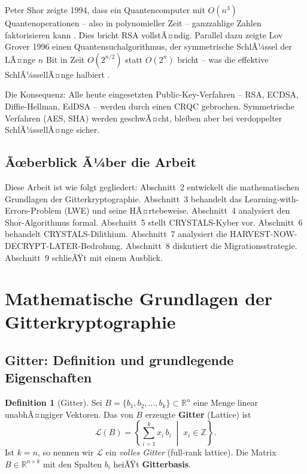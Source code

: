﻿\documentclass[a4paper,12pt]{article}
\theoremstyle{definition}
\newtheorem{definition}{Definition}[section]
\begin{document}
Peter Shor zeigte 1994, dass ein Quantencomputer mit $O(n^3)$ Quantenoperationen
-- also in polynomieller Zeit -- ganzzahlige Zahlen faktorisieren kann \cite{Sho94}.
Dies bricht RSA vollstÃ¤ndig. Parallel dazu zeigte Lov Grover 1996 einen
Quantensuchalgorithmus, der symmetrische SchlÃ¼ssel der LÃ¤nge $n$ Bit in Zeit
$O(2^{n/2})$ statt $O(2^n)$ bricht -- was die effektive SchlÃ¼ssellÃ¤nge halbiert
\cite{Gro96}.

Die Konsequenz: Alle heute eingesetzten Public-Key-Verfahren -- RSA, ECDSA,
Diffie-Hellman, EdDSA -- werden durch einen CRQC gebrochen. Symmetrische Verfahren
(AES, SHA) werden geschwÃ¤cht, bleiben aber bei verdoppelter SchlÃ¼ssellÃ¤nge sicher.

\subsection{Ãœberblick Ã¼ber die Arbeit}

Diese Arbeit ist wie folgt gegliedert: Abschnitt~2 entwickelt die mathematischen
Grundlagen der Gitterkryptographie. Abschnitt~3 behandelt das
Learning-with-Errors-Problem (LWE) und seine HÃ¤rtebeweise. Abschnitt~4 analysiert
den Shor-Algorithmus formal. Abschnitt~5 stellt CRYSTALS-Kyber vor.
Abschnitt~6 behandelt CRYSTALS-Dilithium. Abschnitt~7 analysiert die
HARVEST-NOW-DECRYPT-LATER-Bedrohung. Abschnitt~8 diskutiert die
Migrationsstrategie. Abschnitt~9 schlieÃŸt mit einem Ausblick.

\section{Mathematische Grundlagen der Gitterkryptographie}

\subsection{Gitter: Definition und grundlegende Eigenschaften}

\begin{definition}[Gitter]
Sei $B = \{b_1, b_2, \ldots, b_k\} \subset \mathbb{R}^n$ eine Menge linear
unabhÃ¤ngiger Vektoren. Das von $B$ erzeugte \textbf{Gitter} (Lattice) ist
\[
  \mathcal{L}(B) = \left\{ \sum_{i=1}^{k} x_i \, b_i \;\middle|\; x_i \in \mathbb{Z} \right\}.
\]
Ist $k = n$, so nennen wir $\mathcal{L}$ ein \emph{volles Gitter} (full-rank lattice).
Die Matrix $B \in \mathbb{R}^{n \times k}$ mit den Spalten $b_i$ heiÃŸt
\textbf{Gitterbasis}.
\end{definition}
\end{document}
